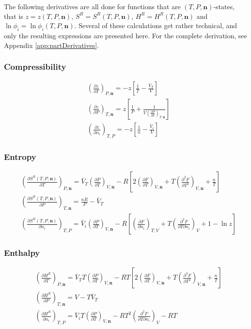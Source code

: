 \documentclass[english]{../thermomemo/thermomemo}
\numberwithin{equation}{section}
\newcommand*{\pder}[2]{\left(\frac{\partial #1}{\partial #2}\right)}
\newcommand*{\pdder}[2]{\left(\frac{\partial^2 #1}{\partial #2^2}\right)}
\newcommand*{\pdcross}[3]{\left(\frac{\partial^2 #1}{\partial #2 \partial #3}\right)}
\begin{document}
The following derivatives are all done for functions that are $(T,P,\textbf{n})$-states, that is $z = z(T,P,\textbf{n})$, $S^R = S^R(T,P,\textbf{n})$, $H^R = H^R(T,P,\textbf{n})$ and $\ln \phi_i = \ln \phi_i(T,P,\textbf{n})$. Several of these calculations get rather technical, and only the resulting expressions are presented here. For the complete derivation, see Appendix \ref{app:partDerivatives}.
\subsubsection*{Compressibility}
\begin{align}
\label{eq:z_T}
& \left( \frac{\partial z}{\partial T} \right)_{P, \textbf{n}} = -z\left[\frac{1}{T} - \frac{\bar{V}_T}{V}\right] \\
\label{eq:z_P}
& \left( \frac{\partial z}{\partial P} \right)_{T, \textbf{n}} = z \left[ \frac{1}{P} + \frac{1}{V \pder{P}{V}_{T,\textbf{n}}} \right] \\
\label{eq:z_i}
& \left( \frac{\partial z}{\partial n_i} \right)_{T,P} = - z \left[ \frac{1}{n} - \frac{\bar{V}_i}{V}  \right]
\end{align}

\subsubsection*{Entropy}
\begin{align}
\label{eq:S^R_T}
& \pder{S^R(T,P,\textbf{n})}{T}_{P,\textbf{n}} = \bar{V}_T \pder{P}{T}_{V,\textbf{n}} - R \left[2\pder{F}{T}_{V,\textbf{n}} + T \pdder{F}{T}_{V,\textbf{n}} + \frac{n}{T} \right] \\
\label{eq:S^R_P}
& \pder{S^R(T,P,\textbf{n})}{P}_{T,\textbf{n}} = \frac{nR}{P} - \bar{V}_T \\
\label{eq:S^R_i}
& \pder{S^R(T,P,\textbf{n})}{n_i}_{T,P} = \bar{V}_i \pder{P}{T}_{V,\textbf{n}} - R\left[ \pder{F}{n_i}_{T,V} + T\pdcross{F}{T}{n_i}_V + 1 - \ln z \right] 
\end{align}

\subsubsection*{Enthalpy}
\begin{align}
\label{eq:H^R_T}
& \pder{H^R}{T}_{P, \textbf{n}} = \bar{V}_T T \pder{P}{T}_{V,\textbf{n}} - RT \left[ 2\pder{F}{T}_{V,\textbf{n}} + T \pdder{F}{T}_{V,\textbf{n}} + \frac{n}{T} \right] \\
\label{eq:H^R_P}
& \pder{H^R}{P}_{T, \textbf{n}} = V - T \bar{V}_T \\
\label{eq:H^R_i}
& \pder{H^R}{n_i}_{T,P}  = \bar{V}_i T \pder{P}{T}_{V,\textbf{n}} -RT^2 \pdcross{F}{T}{n_i}_V - RT
\end{align}
\end{document}
